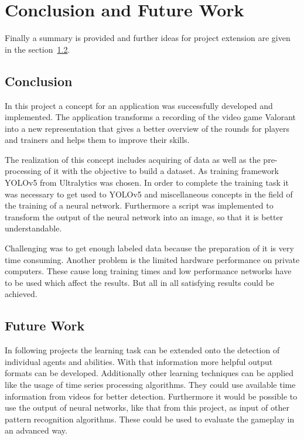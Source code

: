 \chapter{Conclusion and Future Work}\label{chpt:conclusion+future}
\glsresetall

Finally a summary is provided and further ideas for project extension are given in the 
section~\ref{sec:future}.

\section{Conclusion}\label{sec:conclusion}

In this project a concept for an application was successfully developed and implemented. The 
application transforms a recording of the video game Valorant into a new representation that gives 
a better overview of the rounds for players and trainers and helps them to improve their skills.

The realization of this concept includes acquiring of data as well as the pre-pro\-ces\-sing of it with 
the objective to build a dataset. As training framework YOLOv5 from Ultralytics was chosen. In order 
to complete the training task it was necessary to get used to YOLOv5 and miscellaneous concepts in 
the field of the training of a neural network. Furthermore a script was implemented to transform the 
output of the neural network into an image, so that it is better understandable.

Challenging was to get enough labeled data because the preparation of it is very time consuming. 
Another problem is the limited hardware performance on private computers. These cause long 
training times and low performance networks have to be used which affect the results. But all in all 
satisfying results could be achieved.

\section{Future Work}\label{sec:future}

In following projects the learning task can be extended onto the detection of individual agents and 
abilities. With that information more helpful output formats can be developed. Additionally other 
learning techniques can be applied like the usage of time series processing algorithms. 
They could use available time information from videos for better detection. Furthermore it would be 
possible to use the output of neural networks, like that from this project, as input of other pattern 
recognition algorithms. These could be used to evaluate the gameplay in an advanced way.
